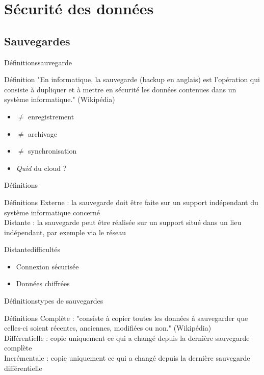 \documentclass[12pt]{beamer}
\begin{document}
\section{Sécurité des données}

	\subsection{Sauvegardes}
	
		\begin{frame}{Définitions}{sauvegarde}
			\begin{exampleblock}{Définition}
				"En informatique, la \alert{sauvegarde} (backup en anglais) est l'opération qui consiste à dupliquer 
				et à mettre en sécurité les données contenues dans un système informatique." (Wikipédia)
			\end{exampleblock}	
			\begin{itemize}
				\item $\neq$ enregistrement
				\item $\neq$ archivage
				\item $\neq$ synchronisation
				\item \textit{Quid} du cloud ?
			\end{itemize}		
		\end{frame}
		
		\begin{frame}{Définitions}
			\begin{exampleblock}{Définitions}
				\alert{Externe} : la sauvegarde doit être faite sur un support indépendant du système informatique concerné \\
				\alert{Distante} : la sauvegarde peut être réalisée sur un support situé dans un lieu indépendant, par exemple via le réseau
			\end{exampleblock}
		\end{frame}
		
		\begin{frame}{Distante}{difficultés}
			\begin{itemize}
				\item Connexion sécurisée
				\item Données chiffrées
			\end{itemize}		
		\end{frame}
		
		\begin{frame}{Définitions}{types de sauvegardes}
			\begin{exampleblock}{Définitions}
				\alert{Complète} : "consiste à copier toutes les données à sauvegarder que celles-ci soient récentes, anciennes, modifiées ou non." (Wikipédia) \\
				\alert{Différentielle} : copie uniquement ce qui a changé depuis la dernière sauvegarde complète \\
				\alert{Incrémentale} : copie uniquement ce qui a changé depuis la dernière sauvegarde différentielle
			\end{exampleblock}
		\end{frame}
		
\end{document}
